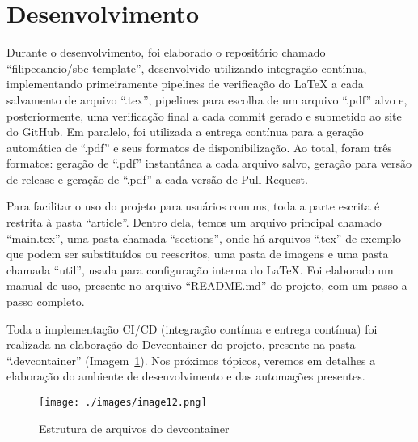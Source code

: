 \section{Desenvolvimento}

Durante o desenvolvimento, foi elaborado o repositório chamado ``filipecancio/sbc-template'', desenvolvido utilizando integração contínua, implementando primeiramente pipelines de verificação do LaTeX a cada salvamento de arquivo ``.tex'', pipelines para escolha de um arquivo ``.pdf'' alvo e, posteriormente, uma verificação final a cada commit gerado e submetido ao site do GitHub. Em paralelo, foi utilizada a entrega contínua para a geração automática de ``.pdf'' e seus formatos de disponibilização. Ao total, foram três formatos: geração de ``.pdf'' instantânea a cada arquivo salvo, geração para versão de release e geração de ``.pdf'' a cada versão de Pull Request.

Para facilitar o uso do projeto para usuários comuns, toda a parte escrita é restrita à pasta ``article''. Dentro dela, temos um arquivo principal chamado ``main.tex'', uma pasta chamada ``sections'', onde há arquivos ``.tex'' de exemplo que podem ser substituídos ou reescritos, uma pasta de imagens e uma pasta chamada ``util'', usada para configuração interna do LaTeX. 
Foi elaborado um manual de uso, presente no arquivo ``README.md'' do projeto, com um passo a passo completo.

Toda a implementação CI/CD (integração contínua e entrega contínua) foi realizada na elaboração do Devcontainer do projeto, presente na pasta ``.devcontainer'' (Imagem~\ref{fig:image12}). Nos próximos tópicos, veremos em detalhes a elaboração do ambiente de desenvolvimento e das automações presentes.


\begin{figure}[ht]
	\centering
	\texttt{[image: ./images/image12.png]}
	\caption{Estrutura de arquivos do devcontainer}
	\label{fig:image12}
\end{figure}